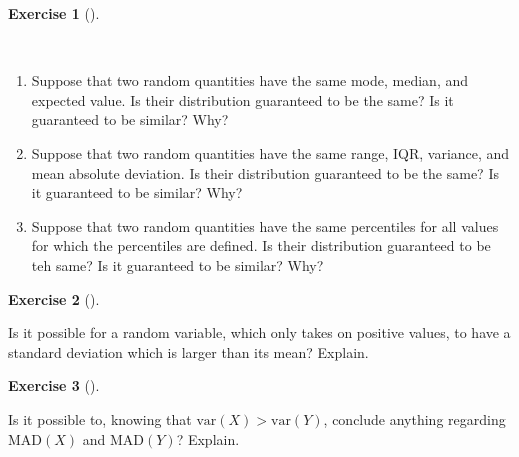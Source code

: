 \documentclass[
  letterpaper,
  DIV=11,
  numbers=noendperiod]{scrreprt}
\providecommand{\tightlist}{%
  \setlength{\itemsep}{0pt}\setlength{\parskip}{0pt}}\usepackage{longtable,booktabs,array}
\theoremstyle{definition}
\newtheorem{exercise}{Exercise}[chapter]
\theoremstyle{definition}
\theoremstyle{definition}
\theoremstyle{remark}
\begin{document}
\begin{exercise}[]\protect\hypertarget{exr-6.9}{}\label{exr-6.9}

~

\begin{enumerate}
\def\labelenumi{\alph{enumi}.}
\tightlist
\item
  Suppose that two random quantities have the same mode, median, and
  expected value. Is their distribution guaranteed to be the same? Is it
  guaranteed to be similar? Why?
\item
  Suppose that two random quantities have the same range, IQR, variance,
  and mean absolute deviation. Is their distribution guaranteed to be
  the same? Is it guaranteed to be similar? Why?
\item
  Suppose that two random quantities have the same percentiles for all
  values for which the percentiles are defined. Is their distribution
  guaranteed to be teh same? Is it guaranteed to be similar? Why?
\end{enumerate}

\end{exercise}

\begin{exercise}[]\protect\hypertarget{exr-6.10}{}\label{exr-6.10}

Is it possible for a random variable, which only takes on positive
values, to have a standard deviation which is larger than its mean?
Explain.

\end{exercise}

\begin{exercise}[]\protect\hypertarget{exr-6.11}{}\label{exr-6.11}

Is it possible to, knowing that \(\text{var}(X) > \text{var}(Y)\),
conclude anything regarding \(\text{MAD}(X)\) and \(\text{MAD}(Y)\)?
Explain.

\end{exercise}
\end{document}

